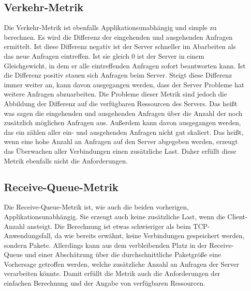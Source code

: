 \documentclass[a4paper, 12pt, BCOR10mm, DIV12, toc=bibliography, toc=listof, german]{scrbook}
\begin{document}
	
		\subsection*{Verkehr-Metrik} %

		Die Verkehr-Metrik ist ebenfalls Applikationsunabhängig und simple zu berechnen. Es wird die
		Differenz der eingehenden und ausgehenden Anfragen ermittelt. Ist diese Differenz negativ ist
		der Server schneller im Abarbeiten als das neue Anfragen eintreffen. Ist sie gleich 0 ist der
		Server in einem Gleichgewicht, in dem er alle eintreffenden Anfragen sofort beantworten kann.
		Ist die Differenz positiv stauen sich Anfragen beim Server. Steigt diese Differenz immer
		weiter an, kann davon ausgegangen werden, dass der Server Probleme hat weitere Anfragen
		abzuarbeiten. Die Probleme dieser Metrik sind jedoch die Abbildung der Differenz auf die
		verfügbaren Ressourcen des Servers. Das heißt was sagen die eingehenden und ausgehenden Anfragen
		über die Anzahl der noch zusätzlich möglichen Anfragen aus. Außerdem kann davon ausgegangen
		werden, das ein zählen aller ein- und ausgehenden Anfragen nicht gut skaliert. Das heißt, wenn
		eine hohe Anzahl an Anfragen auf den Server abgegeben werden, erzeugt das Überwachen aller
		Verbindungen einen zusätzliche Last. Daher erfüllt diese Metrik ebenfalls nicht die
		Anforderungen.
		

		\subsection*{Receive-Queue-Metrik} %

		Die Receive-Queue-Metrik ist, wie auch die beiden vorherigen, Applikationsunabhängig. Sie
		erzeugt auch keine zusätzliche Last, wenn die Client-Anzahl ansteigt. Die Berechnung ist etwas
		schwieriger als beim TCP-Anwendungsfall, da wie bereits erwähnt, keine Verbindungen gespeichert
		werden, sondern Pakete. Allerdings kann aus dem verbleibenden Platz in der Receive-Queue und
		einer Abschätzung über die durchschnittliche Paketgröße eine Vorhersage getroffen werden, welche
		zusätzliche Anzahl an Anfragen der Server verarbeiten könnte. Damit erfüllt die Metrik auch die
		Anforderungen der einfachen Berechnung und der Angabe von verfügbaren Ressourcen.
		
\end{document}
